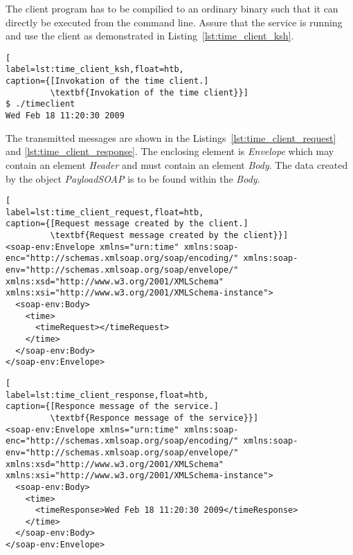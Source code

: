 The client program has to be compilied to an ordinary binary such that it can directly be executed from the command line.
Assure that the service is running and use the client as demonstrated in Listing~\ref{lst:time_client_ksh}.
\begin{lstlisting}[
label=lst:time_client_ksh,float=htb,
caption={[Invokation of the time client.]
         \textbf{Invokation of the time client}}]
$ ./timeclient
Wed Feb 18 11:20:30 2009
\end{lstlisting}
The transmitted messages are shown in the Listings~\ref{lst:time_client_request} and \ref{lst:time_client_response}.
The enclosing element is \textit{Envelope} which may contain an element \textit{Header} and must contain an element \textit{Body}. %
The data created by the object \textit{PayloadSOAP} is to be found within the \textit{Body}.
\begin{lstlisting}[
label=lst:time_client_request,float=htb,
caption={[Request message created by the client.]
         \textbf{Request message created by the client}}]
<soap-env:Envelope xmlns="urn:time" xmlns:soap-enc="http://schemas.xmlsoap.org/soap/encoding/" xmlns:soap-env="http://schemas.xmlsoap.org/soap/envelope/" xmlns:xsd="http://www.w3.org/2001/XMLSchema" xmlns:xsi="http://www.w3.org/2001/XMLSchema-instance">
  <soap-env:Body>
    <time>
      <timeRequest></timeRequest>
    </time>
  </soap-env:Body>
</soap-env:Envelope>
\end{lstlisting}


\begin{lstlisting}[
label=lst:time_client_response,float=htb,
caption={[Responce message of the service.]
         \textbf{Responce message of the service}}]
<soap-env:Envelope xmlns="urn:time" xmlns:soap-enc="http://schemas.xmlsoap.org/soap/encoding/" xmlns:soap-env="http://schemas.xmlsoap.org/soap/envelope/" xmlns:xsd="http://www.w3.org/2001/XMLSchema" xmlns:xsi="http://www.w3.org/2001/XMLSchema-instance">
  <soap-env:Body>
    <time>
      <timeResponse>Wed Feb 18 11:20:30 2009</timeResponse>
    </time>
  </soap-env:Body>
</soap-env:Envelope>
\end{lstlisting}


















